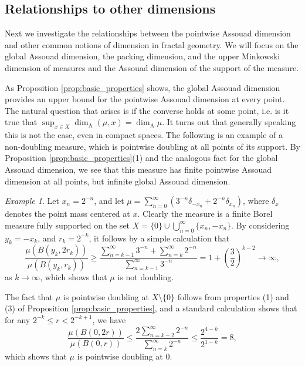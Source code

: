 \documentclass{PRM}
\newcommand{\adim}{\dim_{\mathrm{A}}}
\theoremstyle{plain}
\theoremstyle{definition}
\theoremstyle{remark}
\newtheorem{example}[thm]{Example}
\begin{document}
\subsection{Relationships to other dimensions}

Next we investigate the relationships between the pointwise Assouad dimension and other common notions of dimension in fractal geometry. We will focus on the global Assouad dimension, the packing dimension, and the upper Minkowski dimension of measures and the Assouad dimension of the support of the measure.

As Proposition \ref{prop:basic_properties} shows, the global Assouad dimension provides an upper bound for the pointwise Assouad dimension at every point. The natural question that arises is if the converse holds at some point, i.e. is it true that $\sup_{x\in X}\adim(\mu,x)=\adim\mu$. It turns out that generally speaking this is not the case, even in compact spaces. The following is an example of a non-doubling measure, which is pointwise doubling at all points of its support. By Proposition \ref{prop:basic_properties}(1) and the analogous fact for the global Assouad dimension, we see that this measure has finite pointwise Assouad dimension at all points, but infinite global Assouad dimension.

\begin{example}\label{ex:loc_not_glob_doubling}
    Let $x_n=2^{-n}$, and let $\mu=\sum_{n=0}^{\infty}(3^{-n}\delta_{-x_n}+2^{-n}\delta_{x_n})$, where $\delta_x$ denotes the point mass centered at $x$. Clearly the measure is a finite Borel measure fully supported on the set $X=\{0\}\cup\bigcup_{n=0}^{\infty}\{x_n,-x_n\}$. By considering $y_k=-x_k$, and $r_k=2^{-k}$, it follows by a simple calculation that
    \begin{equation*}
        \frac{\mu(B(y_k,2r_k))}{\mu(B(y_k,r_k))}\geq\frac{\sum_{n=k-1}^{\infty}3^{-n}+\sum_{n=k}^{\infty}2^{-n}}{\sum_{n=k-1}^{\infty}3^{-n}}=1+\left(\frac{3}{2}\right)^{k-2} \to \infty,
    \end{equation*}
    as $k\to\infty$, which shows that $\mu$ is not doubling.
    
    The fact that $\mu$ is pointwise doubling at $X\setminus\{0\}$ follows from properties (1) and (3) of Proposition \ref{prop:basic_properties}, and a standard calculation shows that for any  $2^{-k}\leq r < 2^{-k+1}$, we have
    \begin{equation*}
        \frac{\mu(B(0,2r))}{\mu(B(0,r))}\leq \frac{2\sum_{n=k-2}^{\infty}2^{-n}}{\sum_{n=k}^{\infty}2^{-n}}\leq\frac{2^{4-k}}{2^{1-k}}=8,
    \end{equation*}
    which shows that $\mu$ is pointwise doubling at $0$.
\end{example}
\end{document}
